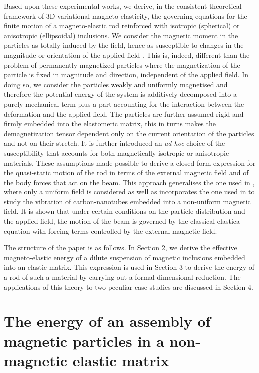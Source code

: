 \documentclass[oneside]{article}
\begin{document}
Based upon these experimental works, we derive, in the consistent theoretical framework of 3D variational magneto-elasticity, the governing equations for the finite motion of a magneto-elastic rod reinforced with isotropic (spherical) or anisotropic (ellipsoidal) inclusions. We consider the magnetic moment in the particles as totally induced by the field, hence as susceptible to changes in the magnitude or orientation of the applied field \cite{Shine1987}. This is, indeed, different than the problem of permanently magnetized particles \cite{Singh2013,Vella2013} where the magnetization of the particle is fixed in magnitude and direction, independent of the applied field. In doing so, we consider the particles weakly and uniformly magnetised and therefore the potential energy of the system is additively decomposed into a purely mechanical term plus a part accounting for the interaction between the deformation and the applied field. The particles are further assumed rigid and firmly embedded into the elastomeric matrix, this in turns makes the demagnetization tensor dependent only on the current orientation of the particles and not on their stretch. It is further introduced an \textit{ad-hoc} choice of the susceptibility that accounts for both magnetically isotropic or anisotropic materials. These assumptions made possible to derive a closed form expression for the quasi-static motion of the rod in terms of the external magnetic field and of the body forces that act on the beam. {This approach generalises the one used in \cite{Kimura2010, VonLockette2011, Kimura2012, Stanier2016}, where only a uniform field is considered as well as incorporates the one used in \cite{Wang2015} to study the vibration of carbon-nanotubes embedded into a non-uniform magnetic field. }
It is shown that under certain conditions on the particle distribution and the applied field, the motion of the beam is governed by the classical elastica equation with forcing terms controlled by the external magnetic field. 

The structure of the paper is as follows. In Section 2, we derive the effective magneto-elastic energy of a dilute suspension of magnetic inclusions embedded into an elastic matrix. This expression is used in Section 3 to derive the energy of a rod of such a material by carrying out a formal dimensional reduction. The applications of this theory to two peculiar case studies are discussed in Section 4. 


\section{The energy of an assembly of magnetic particles in a non-magnetic elastic matrix}
\end{document}
